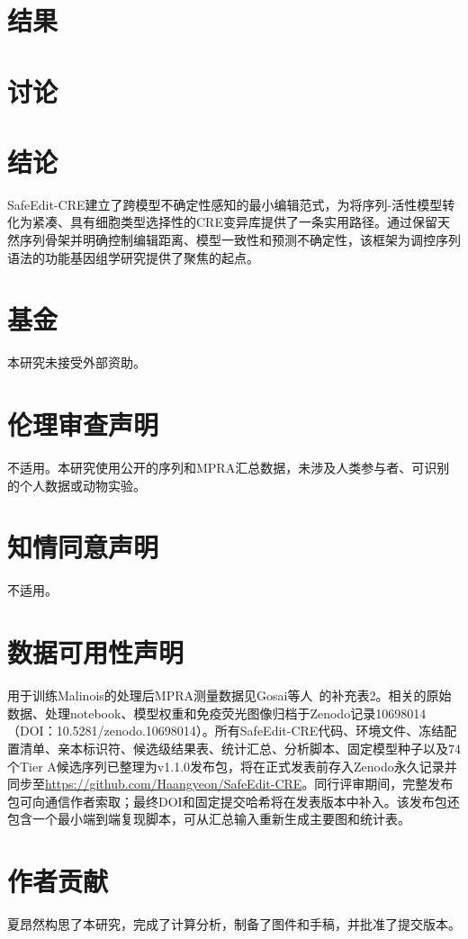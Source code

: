 \documentclass[10pt,a4paper]{article}
\begin{document}
\section{结果}


\section{讨论}


\section{结论}
SafeEdit-CRE建立了跨模型不确定性感知的最小编辑范式，为将序列-活性模型转化为紧凑、具有细胞类型选择性的CRE变异库提供了一条实用路径。通过保留天然序列骨架并明确控制编辑距离、模型一致性和预测不确定性，该框架为调控序列语法的功能基因组学研究提供了聚焦的起点。

\section*{基金}
本研究未接受外部资助。

\section*{伦理审查声明}
不适用。本研究使用公开的序列和MPRA汇总数据，未涉及人类参与者、可识别的个人数据或动物实验。

\section*{知情同意声明}
不适用。

\section*{数据可用性声明}
用于训练Malinois的处理后MPRA测量数据见Gosai等人~\citep{Gosai2024}的补充表2。相关的原始数据、处理notebook、模型权重和免疫荧光图像归档于Zenodo记录10698014（DOI：10.5281/zenodo.10698014）。所有SafeEdit-CRE代码、环境文件、冻结配置清单、亲本标识符、候选级结果表、统计汇总、分析脚本、固定模型种子以及74个Tier A候选序列已整理为v1.1.0发布包，将在正式发表前存入Zenodo永久记录并同步至\url{https://github.com/Haangyeon/SafeEdit-CRE}。同行评审期间，完整发布包可向通信作者索取；最终DOI和固定提交哈希将在发表版本中补入。该发布包还包含一个最小端到端复现脚本，可从汇总输入重新生成主要图和统计表。

\section*{作者贡献}
夏昂然构思了本研究，完成了计算分析，制备了图件和手稿，并批准了提交版本。
\end{document}
